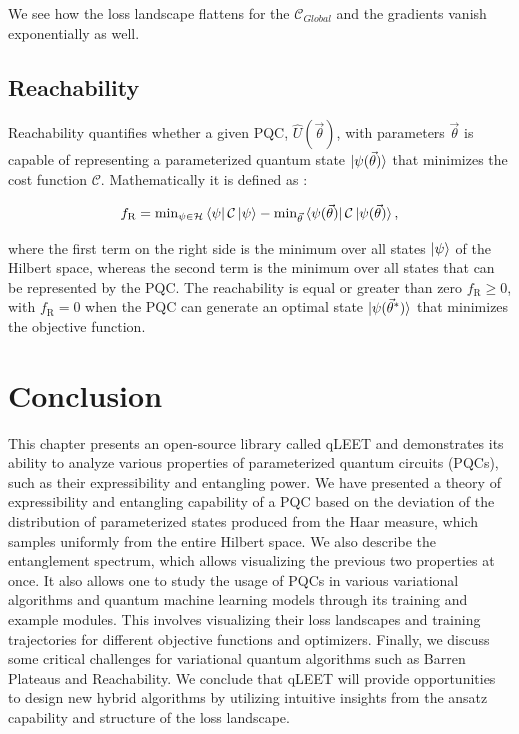 We see how the loss landscape flattens for the $\mathcal{C}_{Global}$ and the gradients vanish exponentially as well. 

\subsection{Reachability}

Reachability quantifies whether a given PQC, $\hat{U}(\vec{\theta})$, with parameters $\vec{\theta}$ is capable of representing a parameterized quantum state $\ket{\psi(\vec{\theta})}$ that minimizes the cost function $\mathcal{C}$. Mathematically it is defined as \cite{PhysRevLett.124.090504}:

\begin{equation}
f_\text{R}=\text{min}_{\psi\in\mathcal{H}}\bra{\psi}\mathcal{C}\ket{\psi}-\text{min}_{\vec{\theta}}\bra{\psi(\vec{\theta})}\mathcal{C}\ket{\psi(\vec{\theta})},
\end{equation}

where the first term on the right side is the minimum over all states $\ket{\psi}$ of the Hilbert space, whereas the second term is the minimum over all states that can be represented by the PQC. The reachability is equal or greater than zero $f_\text{R}\ge0$, with $f_\text{R}=0$ when the PQC can generate an optimal state $\ket{\psi(\vec{\theta}^*)}$ that minimizes the objective function.

\section{Conclusion}

This chapter presents an open-source library called qLEET and demonstrates its ability to analyze various properties of parameterized quantum circuits (PQCs), such as their expressibility and entangling power. We have presented a theory of expressibility and entangling capability of a PQC based on the deviation of the distribution of parameterized states produced from the Haar measure, which samples uniformly from the entire Hilbert space. We also describe the entanglement spectrum, which allows visualizing the previous two properties at once. It also allows one to study the usage of PQCs in various variational algorithms and quantum machine learning models through its training and example modules. This involves visualizing their loss landscapes and training trajectories for different objective functions and optimizers. Finally, we discuss some critical challenges for variational quantum algorithms such as Barren Plateaus and Reachability. We conclude that qLEET will provide opportunities to design new hybrid algorithms by utilizing intuitive insights from the ansatz capability and structure of the loss landscape.
